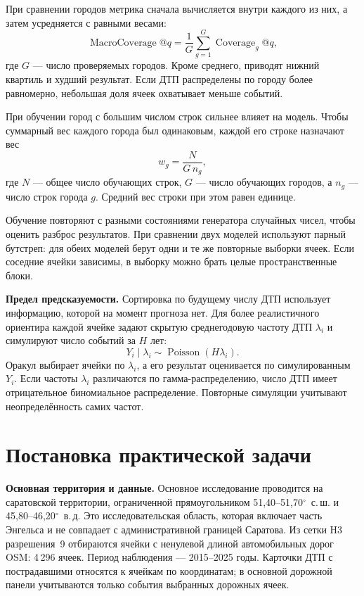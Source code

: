 \documentclass[coursework]{SCWorks}
\begin{document}
При сравнении городов метрика сначала вычисляется внутри каждого
из них, а затем усредняется с равными весами:
\begin{equation}
  \operatorname{MacroCoverage}@q=
  \frac{1}{G}\sum_{g=1}^{G}\operatorname{Coverage}_g@q,
  \label{eq:macro}
\end{equation}
где $G$ --- число проверяемых городов. Кроме среднего, приводят
нижний квартиль и худший результат. Если ДТП распределены по городу
более равномерно, небольшая доля ячеек охватывает меньше событий.

При обучении город с большим числом строк сильнее влияет на модель.
Чтобы суммарный вес каждого города был одинаковым, каждой его строке
назначают вес
\begin{equation}
  w_g=\frac{N}{G\,n_g},
  \label{eq:city_weights}
\end{equation}
где $N$ --- общее число обучающих строк, $G$ --- число обучающих
городов, а $n_g$ --- число строк города $g$. Средний вес строки
при этом равен единице.

Обучение повторяют с разными состояниями генератора случайных чисел,
чтобы оценить разброс результатов. При сравнении двух моделей
используют парный бутстреп: для обеих моделей берут одни и те же
повторные выборки ячеек. Если соседние ячейки зависимы,
в выборку можно брать целые пространственные блоки.

\textbf{Предел предсказуемости.} Сортировка по будущему числу ДТП
использует информацию, которой на момент прогноза нет.
Для более реалистичного ориентира каждой ячейке задают скрытую
среднегодовую частоту ДТП $\lambda_i$ и симулируют число событий
за $H$ лет:
\begin{equation}
  Y_i\mid\lambda_i\sim\operatorname{Poisson}(H\lambda_i).
  \label{eq:oracle_poisson}
\end{equation}
Оракул выбирает ячейки по $\lambda_i$, а его результат оценивается
по симулированным $Y_i$. Если частоты $\lambda_i$ различаются по
гамма-распределению, число ДТП имеет отрицательное биномиальное
распределение. Повторные симуляции учитывают неопределённость
самих частот.


\section{Постановка практической задачи}

\textbf{Основная территория и данные.} Основное исследование
проводится на саратовской территории, ограниченной прямоугольником
51{,}40--51{,}70$^\circ$~с.\,ш. и
45{,}80--46{,}20$^\circ$~в.\,д. Это исследовательская область,
которая включает часть Энгельса и не совпадает с административной
границей Саратова. Из сетки H3 разрешения~9 отбираются ячейки
с ненулевой длиной автомобильных дорог OSM: 4\,296 ячеек.
Период наблюдения --- 2015--2025 годы. Карточки ДТП с пострадавшими
относятся к ячейкам по координатам; в основной дорожной панели
учитываются только события выбранных дорожных ячеек.
\end{document}
